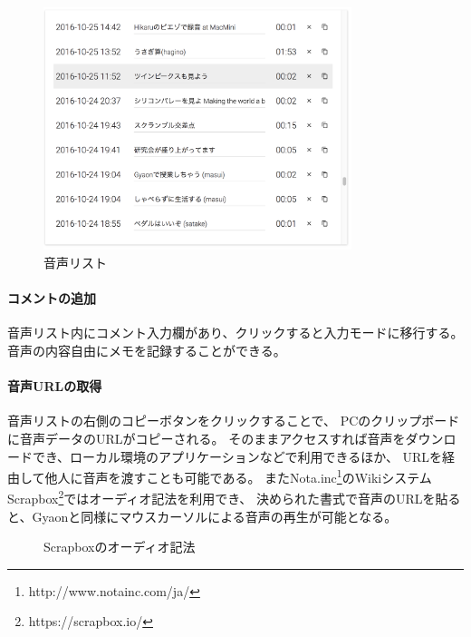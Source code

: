 \begin{figure}[H]
\centering
\includegraphics[width=9cm]{images/list.png}
\caption{音声リスト}
\label{list}
\end{figure}

\paragraph{コメントの追加}
音声リスト内にコメント入力欄があり、クリックすると入力モードに移行する。
音声の内容自由にメモを記録することができる。

\paragraph{音声URLの取得}
音声リストの右側のコピーボタンをクリックすることで、
PCのクリップボードに音声データのURLがコピーされる。
そのままアクセスすれば音声をダウンロードでき、ローカル環境のアプリケーションなどで利用できるほか、
URLを経由して他人に音声を渡すことも可能である。
またNota.inc\footnote{\textsf{http://www.notainc.com/ja/}}のWikiシステム
Scrapbox\footnote{\textsf{https://scrapbox.io/}}ではオーディオ記法を利用でき、
決められた書式で音声のURLを貼ると、Gyaonと同様にマウスカーソルによる音声の再生が可能となる。

\begin{figure}[H]
\centering
{}
\caption{Scrapboxのオーディオ記法}
\label{scrapbox}
\end{figure}

